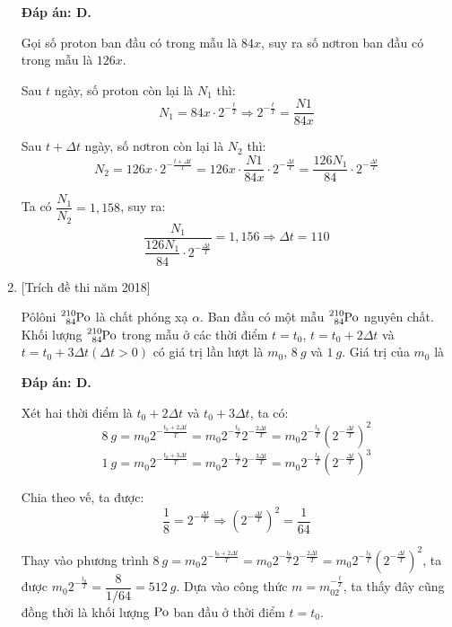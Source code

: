 \begin{enumerate}[label=\bfseries Câu \arabic*:]
	\loigiai
	{		\textbf{Đáp án: D.}
		
		Gọi số proton ban đầu có trong mẫu là $84x$, suy ra số nơtron ban đầu có trong mẫu là $126x$.
		
		Sau $t$ ngày, số proton còn lại là $N_1$ thì:
		$$N_1 = 84x \cdot 2^{-\frac{t}{T}} \Rightarrow 2^{-\frac{t}{T}} = \dfrac{N1}{84x}$$
		
		Sau $t+\Delta t$ ngày, số nơtron còn lại là $N_2$ thì:
		$$N_2 = 126x \cdot 2^{-\frac{t+\Delta t}{T}}=126x \cdot \dfrac{N1}{84x} \cdot 2^{-\frac{\Delta t}{T}}=\dfrac{126N_1}{84} \cdot 2^{-\frac{\Delta t}{T}}$$
		
		Ta có $\dfrac{N_1}{N_2} = 1,158$, suy ra:
		$$\dfrac{N_1}{\dfrac{126N_1}{84} \cdot 2^{-\frac{\Delta t}{T}}} = 1,156 \Rightarrow \Delta t = 110$$
		
	}
	





\item {} [Trích đề thi năm 2018]

\cauhoi
{Pôlôni $\ce{^{210}_{84} Po}$ là chất phóng xạ $\alpha$. Ban đầu có một mẫu $\ce{^{210}_{84} Po}$  nguyên chất. Khối lượng $\ce{^{210}_{84} Po}$ trong mẫu ở các thời điểm $t=t_0$, $t=t_0 +2\Delta t$ và $t=t_0 +3\Delta t (\Delta t>0)$ có giá trị lần lượt là $m_0$, $\SI{8}{g}$ và $\SI{1}{g}$. Giá trị của $m_0$ là
	\begin{mcq}(4)
		\item 256 g.	
		\item 128 g.	
		\item 64 g.	
		\item 512 g.
	\end{mcq}
}

\loigiai
{		\textbf{Đáp án: D.}
	
	Xét hai thời điểm là $t_0 + 2\Delta t$ và $t_0+3\Delta t$, ta có:
	$$\SI{8}{g} = m_0 2^{-\frac{t_0 + 2\Delta t}{T}}=m_0 2^{-\frac{t_0}{T}} 2^{-\frac{2\Delta t}{T}}=m_0 2^{-\frac{t_0}{T}} \left(2^{-\frac{\Delta t}{T}}\right)^2$$
	$$\SI{1}{g} = m_0 2^{-\frac{t_0 + 3\Delta t}{T}}=m_0 2^{-\frac{t_0}{T}} 2^{-\frac{3\Delta t}{T}}=m_0 2^{-\frac{t_0}{T}} \left(2^{-\frac{\Delta t}{T}}\right)^3$$
	
	Chia theo vế, ta được:
	$$\dfrac{1}{8} = 2^{-\frac{\Delta t}{T}} \Rightarrow \left(2^{-\frac{\Delta t}{T}}\right)^2 = \dfrac{1}{64}$$
	
	Thay vào phương trình $\SI{8}{g} = m_0 2^{-\frac{t_0 + 2\Delta t}{T}}=m_0 2^{-\frac{t_0}{T}} 2^{-\frac{2\Delta t}{T}}=m_0 2^{-\frac{t_0}{T}} \left(2^{-\frac{\Delta t}{T}}\right)^2$, ta được $m_0 2^{-\frac{t_0}{T}}=\dfrac{8}{1/64} = \SI{512}{g}$. Dựa vào công thức $m=m_02^{-\frac{t}{T}}$, ta thấy đây cũng đồng thời là khối lượng $\ce{Po}$ ban đầu ở thời điểm $t=t_0$.
	
}
\end{enumerate}
